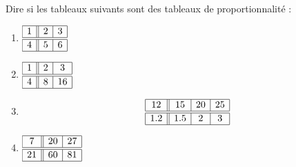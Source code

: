 
\begin{exercice}\label{exo2smath-0112}

    Dire si les tableaux suivants sont des tableaux de proportionnalité :
    \begin{multicols}{2}
    \begin{enumerate}
        \item
         $       \begin{array}[]{|c||c|c|}
                    \hline
                    1&2&3\\
                    \hline\hline
                    4&5&6\\
                    \hline
                \end{array}$
        \item
                $\begin{array}[]{|c||c|c|}
                    \hline
                    1&2&3\\
                    \hline\hline
                    4&8&16\\
                    \hline
                \end{array}
                $
        \item
            \begin{equation*}
                \begin{array}[]{|c||c|c|c|}
                    \hline
                     12&15&20&25\\
                      \hline\hline
                      1.2&1.5&2&3\\ 
                      \hline 
                       \end{array}
                   \end{equation*}
               \item
                      $ \begin{array}[]{|c||c|c|}
                           \hline
                           7&20&27\\
                           \hline\hline
                           21&60&81\\
                           \hline
                       \end{array}
                       $
    \end{enumerate}
    \end{multicols}

\end{exercice}
